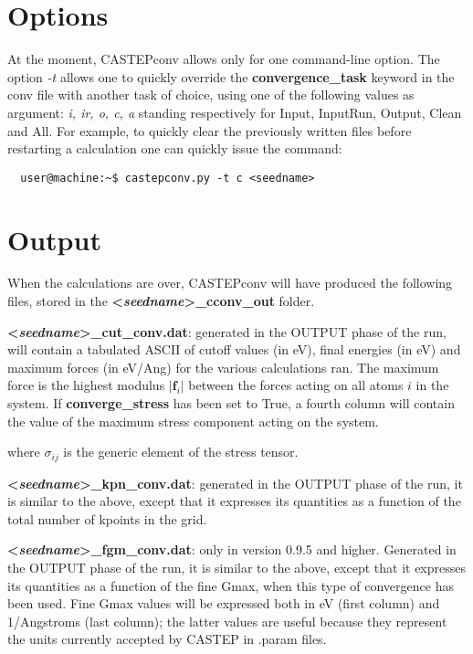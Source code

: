 \documentclass[10pt]{article}
\begin{document}
\section{Options}

At the moment, CASTEPconv allows only for one command-line option. The option \textit{-t} allows one to quickly override the \textbf{convergence\_task} keyword in the conv file with another task of choice, using one of the following values as argument: \textit{i, ir, o, c, a} standing respectively for Input, InputRun, Output, Clean and All. For example, to quickly clear the previously written files before restarting a calculation one can quickly issue the command:

\begin{lstlisting}
  user@machine:~$ castepconv.py -t c <seedname>
\end{lstlisting}

\section{Output}

When the calculations are over, CASTEPconv will have produced the following 
files, stored in the \textbf{\textless \textit{seedname}\textgreater\_cconv\_out}
folder.

\textbf{\textless \textit{seedname}\textgreater\_cut\_conv.dat}: generated in 
the OUTPUT phase of the run, will contain a tabulated ASCII of cutoff values (in 
eV), final energies (in eV) and maximum forces (in eV/Ang) for the various 
calculations ran. The maximum force is the highest modulus $|\mathbf{f}_i|$ 
between the forces acting on all atoms $i$ in the system. If 
\textbf{converge\_stress} has been set to True, a fourth column will contain the 
value of the maximum stress component acting on the system.

where $\sigma_{ij}$ is the generic element of the stress tensor.

\textbf{\textless \textit{seedname}\textgreater\_kpn\_conv.dat}: generated in 
the OUTPUT phase of the run, it is similar to the above, except that it 
expresses its quantities as a function of the total number of kpoints in the 
grid.

\textbf{\textless \textit{seedname}\textgreater\_fgm\_conv.dat}: only in version 0.9.5 and higher. Generated in 
the OUTPUT phase of the run, it is similar to the above, except that it 
expresses its quantities as a function of the fine Gmax, when this type of convergence has been used. Fine Gmax
values will be expressed both in eV (first column) and 1/Angstroms (last column); the latter values are useful
because they represent the units currently accepted by CASTEP in .param files.
\end{document}
